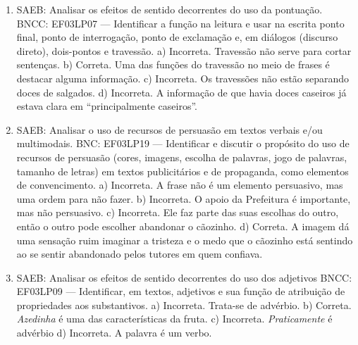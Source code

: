 \begin{enumerate}
\item
SAEB: Analisar os efeitos de sentido decorrentes do uso da pontuação. BNCC: EF03LP07 --- Identificar a função na leitura e usar na escrita ponto final, ponto de interrogação, ponto de exclamação e, em diálogos (discurso direto), dois-pontos e travessão. a) Incorreta. Travessão não serve para cortar sentenças. b) Correta. Uma das funções do travessão no meio de frases é destacar alguma informação. c) Incorreta. Os travessões não estão separando doces de salgados. d) Incorreta. A informação de que havia doces caseiros já estava clara em ``principalmente caseiros''.

\item
SAEB: Analisar o uso de recursos de persuasão em textos verbais e/ou multimodais. BNC: EF03LP19 --- Identificar e discutir o propósito do uso de recursos de persuasão (cores, imagens, escolha de palavras, jogo de palavras, tamanho de letras) em textos publicitários e de propaganda, como elementos de convencimento. a) Incorreta. A frase não é um elemento persuasivo, mas uma ordem para não fazer. b) Incorreta. O apoio da Prefeitura é importante, mas não persuasivo. c) Incorreta. Ele faz parte das suas escolhas do outro, então o outro pode escolher abandonar o cãozinho. d) Correta. A imagem dá uma sensação ruim imaginar a tristeza e o medo que o cãozinho está sentindo ao se sentir abandonado pelos tutores em quem confiava.

\item
SAEB: Analisar os efeitos de sentido decorrentes do uso dos adjetivos BNCC: EF03LP09 --- Identificar, em textos, adjetivos e sua função de atribuição de propriedades aos substantivos. a) Incorreta. Trata-se de advérbio. b) Correta. \emph{Azedinha} é uma das características da fruta. c) Incorreta. \emph{Praticamente} é advérbio d) Incorreta. A palavra é um verbo.
\end{enumerate}


